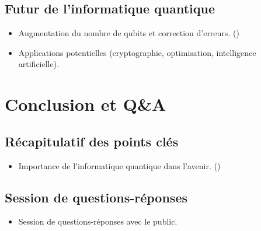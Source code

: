 \documentclass{article}
\begin{document}
\subsection{Futur de l'informatique quantique}
\begin{itemize}
    \item Augmentation du nombre de qubits et correction d'erreurs. (\cite{uopeopleWhatQuantum})
    \item Applications potentielles (cryptographie, optimisation, intelligence artificielle).
\end{itemize}

\section{Conclusion et Q\&A}
\subsection{Récapitulatif des points clés}
\begin{itemize}
    \item Importance de l'informatique quantique dans l'avenir. (\cite{dami})
\end{itemize}
\subsection{Session de questions-réponses}
\begin{itemize}
    \item Session de questions-réponses avec le public.
\end{itemize}

\break\printbibliography
\end{document}
